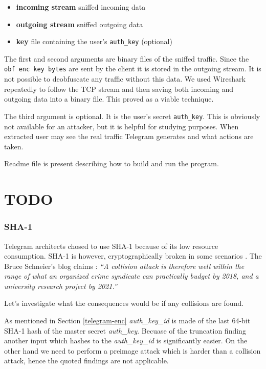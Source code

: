 \documentclass[thesis=M,english]{FITthesis}[2012/10/20]
\begin{document}
\begin{itemize}

	\item \textbf{incoming stream} sniffed incoming data
	\item \textbf{outgoing stream} sniffed outgoing data
	\item \textbf{key} file containing the user's \texttt{auth\_key} (optional)

\end{itemize}

The first and second arguments are binary files of the sniffed traffic. Since the \texttt{obf\ enc\ key\ bytes} are sent by the client it is stored in the outgoing stream. It is not possible to deobfuscate any traffic without this data. We used Wireshark repeatedly to follow the TCP stream and then saving both incoming and outgoing data into a binary file. This proved as a viable technique.

The third argument is optional. It is the user's secret \texttt{auth\_key}. This is obviously not available for an attacker, but it is helpful for studying purposes. When extracted user may see the real traffic Telegram generates and what actions are taken.

Readme file is present describing how to build and run the program.




\chapter{TODO}

\subsection{SHA-1}

Telegram architects chosed to use SHA-1 because of its low resource consumption. SHA-1 is however, cryptographically broken in some scenarios \cite{telegram-sha1}. The Bruce Schneier's blog claims \cite{telegram-sha1}: \emph{``A collision attack is therefore well within the range of what an organized crime syndicate can practically budget by 2018, and a university research project by 2021.''}

Let's investigate what the consequences would be if any collisions are found.

As mentioned in Section \ref{telegram-enc} \emph{auth\_key\_id} is made of the last 64-bit SHA-1 hash of the master secret \emph{auth\_key}. Becuase of the truncation finding another input which hashes to the \emph{auth\_key\_id} is significantly easier. On the other hand we need to perform a preimage attack which is harder than a collision attack, hence the quoted findings are not applicable.
\end{document}
